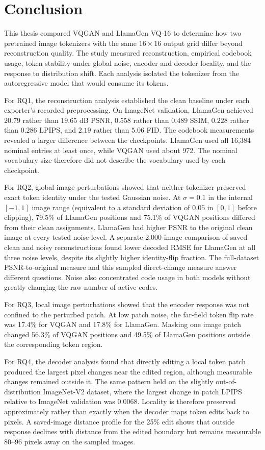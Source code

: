 \chapter{Conclusion}
\label{ch:conclusion}

This thesis compared VQGAN and LlamaGen VQ-16 to determine how two pretrained
image tokenizers with the same $16\times16$ output grid differ beyond
reconstruction quality. The study measured reconstruction, empirical codebook
usage, token stability under global noise, encoder and decoder locality, and
the response to distribution shift. Each analysis isolated the tokenizer from
the autoregressive model that would consume its tokens.

For RQ1, the reconstruction analysis established the clean baseline under
each exporter's recorded preprocessing. On ImageNet validation, LlamaGen achieved
$20.79$ rather than $19.65$ dB PSNR, $0.558$ rather than $0.489$ SSIM, $0.228$
rather than $0.286$ LPIPS, and $2.19$ rather than $5.06$ FID. The codebook
measurements revealed a larger difference between the checkpoints. LlamaGen
used all 16{,}384 nominal entries at least once, while VQGAN used about
972. The nominal vocabulary size therefore did not describe the vocabulary
used by each checkpoint.

For RQ2, global image perturbations showed that neither tokenizer
preserved exact token identity under the tested Gaussian noise. At $\sigma=0.1$
in the internal $[-1,1]$ image range (equivalent to a standard deviation of
$0.05$ in $[0,1]$ before clipping),
79.5\% of LlamaGen positions and 75.1\% of VQGAN positions differed from their
clean assignments. LlamaGen had higher PSNR to the original clean image at
every tested noise level. A separate 2{,}000-image comparison of saved clean
and noisy reconstructions found lower decoded RMSE for LlamaGen at all three
noise levels, despite its slightly higher identity-flip fraction. The
full-dataset PSNR-to-original measure and this sampled direct-change measure
answer different questions. Noise also concentrated code usage in
both models without greatly changing the raw number of active codes.

For RQ3, local image perturbations showed that the encoder response was
not confined to the perturbed patch. At low patch noise, the far-field token
flip rate was 17.4\% for VQGAN and 17.8\% for LlamaGen. Masking one image patch
changed 56.3\% of VQGAN positions and 49.5\% of LlamaGen positions outside the
corresponding token region.

For RQ4, the decoder analysis found that directly editing a
local token patch produced the largest pixel changes near the edited region,
although measurable changes remained outside it. The same pattern held on the
slightly out-of-distribution ImageNet-V2 dataset, where the largest change in
patch LPIPS relative to ImageNet validation was 0.0068. Locality is therefore
preserved approximately rather than exactly when the decoder maps token edits
back to pixels. A saved-image distance profile for the 25\% edit shows that
outside response declines with distance from the edited boundary but remains
measurable 80--96 pixels away on the sampled images.

